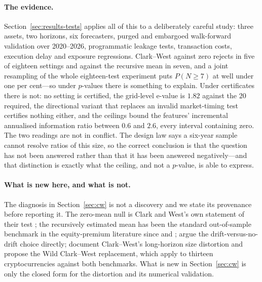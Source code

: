 \documentclass{article}
\theoremstyle{plain}
\theoremstyle{definition}
\begin{document}
\paragraph{The evidence.} Section~\ref{sec:results-tests} applies all of this to a
deliberately careful study: three assets, two horizons, six forecasters, purged and
embargoed walk-forward validation over 2020--2026, programmatic leakage tests, transaction
costs, execution delay and exposure regressions. Clark--West against zero rejects in five of
eighteen settings and against the recursive mean in seven, and a joint resampling of the
whole eighteen-test experiment puts $P(N\ge7)$ at well under one per cent---so under
$p$-values there is something to explain. Under certificates there is not: no setting is
certified, the grid-level e-value is $1.82$ against the $20$ required, the directional
variant that replaces an invalid market-timing test certifies nothing either, and the
ceilings bound the features' incremental annualised information ratio between $0.6$ and
$2.6$, every interval containing zero. The two readings are not in conflict. The design law says a six-year sample
cannot resolve ratios of this size, so the correct conclusion is that the question has not
been answered rather than that it has been answered negatively---and that distinction is
exactly what the ceiling, and not a $p$-value, is able to express.

\paragraph{What is new here, and what is not.}
The diagnosis in Section~\ref{sec:cw} is not a discovery and we state its provenance before
reporting it. The zero-mean null is Clark and West's own statement of their test
\citep{clark2006}; the recursively estimated mean has been the standard out-of-sample
benchmark in the equity-premium literature since \citet{welch2008} and \citet{campbell2008};
\citet{moosa2016} argue the drift-versus-no-drift choice directly; \citet{pincheira2021}
document Clark--West's long-horizon size distortion and propose the Wild Clark--West
replacement, which \citet{magner2022} apply to thirteen cryptocurrencies against both
benchmarks. What is new in Section~\ref{sec:cw} is only the closed form for the distortion
and its numerical validation.
\end{document}
